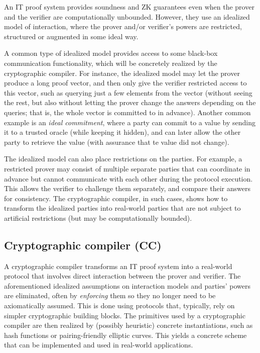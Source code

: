 An IT proof system provides soundness and ZK guarantees even when the prover and the verifier are computationally unbounded.
However, they use an idealized model of interaction, where the prover and/or verifier's powers 
are restricted, structured or augmented in some ideal way. 

A common type of idealized model provides access to some black-box communication functionality, which will be concretely realized by the cryptographic compiler.
For instance, the idealized model may let the prover produce a long proof vector, and then only give the verifier restricted access to this vector, such as querying just a few elements from the vector (without seeing the rest, but also without letting the prover change the answers depending on the queries; that is, the whole vector is committed to in advance).
Another common example is an \emph{ideal commitment}, where a party can commit to a value by sending it to a trusted oracle (while keeping it hidden), and can later allow the other party to retrieve the value (with assurance that te value did not change).


The idealized model can also place restrictions on the parties. 
For example, a restricted prover may consist of multiple separate parties that can coordinate in advance but cannot communicate with each other during the protocol execution.
This allows the verifier to challenge them separately, and compare their answers for consistency.
The cryptographic compiler, in such cases, shows how to transform the idealized parties into real-world parties that are not subject to artificial restrictions (but may be computationally bounded).
\loosen


\vspace{-.6em}
\subsection{Cryptographic compiler (CC)}
\label{par:paradigms:background:CC}

\vspace{-.5em}
A cryptographic compiler transforms an IT proof system into a real-world protocol that involves direct interaction between the prover and verifier.
The aforementioned idealized assumptions on interaction models and parties' powers are eliminated, often by \emph{enforcing} them so they no longer need to be axiomatically assumed.
This is done using protocols that, typically, rely on simpler cryptographic building blocks.
The primitives used by a cryptographic compiler are then realized by (possibly heuristic) concrete instantiations, such as hash functions or pairing-friendly elliptic curves.
This yields a concrete scheme that can be implemented and used in real-world applications.


